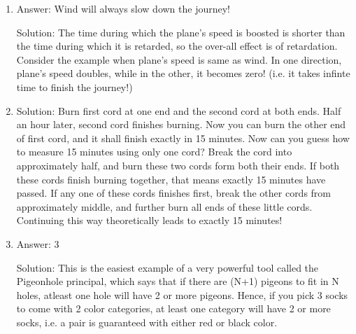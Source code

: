 \begin{enumerate}
\item
Answer: Wind will always slow down the journey!
 
Solution: The time during which the plane's speed is boosted is shorter than the time during which it is retarded, so the over-all effect is of retardation. Consider the example when plane's speed is same as wind. In one direction, plane's speed doubles, while in the other, it becomes zero! (i.e. it takes infinte time to finish the journey!)




\item
Solution: Burn first cord at one end and the second cord at both ends. Half an hour later, second cord finishes burning. Now you can burn the other end of first cord, and it shall finish exactly in 15 minutes.
Now can you guess how to measure 15 minutes using only one cord?
Break the cord into approximately half, and burn these two cords form both their ends. If both these cords finish burning together, that means exactly 15 minutes have passed. If any one of these cords finishes first, break the other cords from approximately middle, and further burn all ends of these little cords. Continuing this way theoretically leads to exactly 15 minutes!




\item
Answer: 3
 
Solution: This is the easiest example of a very powerful tool called the Pigeonhole principal, which says that if there are (N+1) pigeons to fit in N holes, atleast one hole will have 2 or more pigeons. Hence, if you pick 3 socks to come with 2 color categories, at least one category will have 2 or more socks, i.e. a pair is guaranteed with either red or black color.





\end{enumerate}
